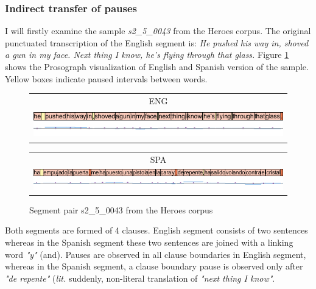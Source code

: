 \subsubsection{Indirect transfer of pauses}

I will firstly examine the sample \textit{s2\_5\_0043} from the Heroes corpus. The original punctuated transcription of the English segment is: \textit{He pushed his way in, shoved a gun in my face. Next thing I know, he's flying through that glass.} Figure \ref{figure:heroes_viz_1} shows the Prosograph visualization of English and Spanish version of the sample. Yellow boxes indicate paused intervals between words.

\begin{figure}[h!]
\begin{minipage}{\textwidth}
\begin{tabular}{c}
ENG \\
\includegraphics[height=1.2cm, width=\textwidth]{img/s2_5_0043-EN.png} \\
\end{tabular}
\end{minipage}
\begin{minipage}{\textwidth}
\begin{tabular}{c}
SPA \\
\includegraphics[width=\textwidth]{img/s2_5_0043-ES.png} \\
\end{tabular}
\end{minipage}
\caption{Segment pair s2\_5\_0043 from the Heroes corpus}
\label{figure:heroes_viz_1}
\end{figure}

Both segments are formed of 4 clauses. English segment consists of two sentences whereas in the Spanish segment these two sentences are joined with a linking word \textit{"y"} (and). Pauses are observed in all clause boundaries in English segment, whereas in the Spanish segment, a clause boundary pause is observed only after \textit{"de repente"} (\textit{lit.} suddenly, non-literal translation of \textit{"next thing I know"}. 

